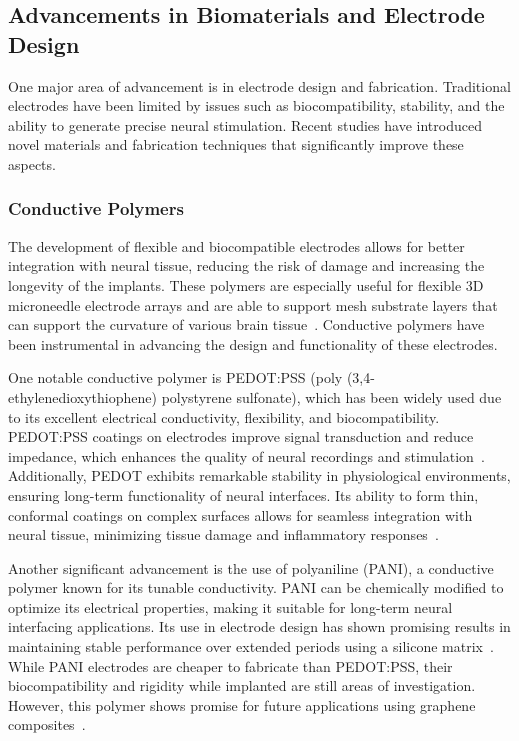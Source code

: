 \documentclass[twocolumn,10pt]{article}
\begin{document}
\subsection*{Advancements in Biomaterials and Electrode Design}
One major area of advancement is in electrode design and fabrication.
Traditional electrodes have been limited by issues such as biocompatibility,
stability, and the ability to generate precise neural stimulation. Recent
studies have introduced novel materials and fabrication techniques that
significantly improve these aspects.

\subsubsection*{Conductive Polymers}
The development of flexible and biocompatible electrodes allows for better
integration with neural tissue, reducing the risk of damage and increasing the
longevity of the implants. These polymers are especially useful for flexible 3D
microneedle electrode arrays and are able to support mesh substrate layers that
can support the curvature of various brain
tissue~\parencite{xiangFlexibleThreedimensionalElectrode2016}. Conductive
polymers have been instrumental in advancing the design and functionality of
these electrodes.

One notable conductive polymer is PEDOT:PSS (poly (3,4-ethylenedioxythiophene)
polystyrene sulfonate), which has been widely used due to its excellent
electrical conductivity, flexibility, and biocompatibility. PEDOT:PSS coatings
on electrodes improve signal transduction and reduce impedance, which enhances
the quality of neural recordings and
stimulation~\parencite{rivnayHighperformanceTransistorsBioelectronics2015}.
Additionally, PEDOT exhibits remarkable stability in physiological environments,
ensuring long-term functionality of neural interfaces. Its ability to form thin,
conformal coatings on complex surfaces allows for seamless integration with
neural tissue, minimizing tissue damage and inflammatory
responses~\parencite{zhangRecentProgressPEDOTbased2022}.

Another significant advancement is the use of polyaniline (PANI), a conductive
polymer known for its tunable conductivity. PANI can be
chemically modified to optimize its electrical properties, making it suitable
for long-term neural interfacing applications. Its use in electrode design has
shown promising results in maintaining stable performance over extended periods
using a silicone matrix~\parencite{almuflehHighlyFlexiblePolyanilineBased2021}.
While PANI electrodes are cheaper to fabricate than PEDOT:PSS, their
biocompatibility and rigidity while implanted are still areas of investigation.
However, this polymer shows promise for future applications using graphene
composites~\parencite{liuBiocompatibleHighPerformanceWetAdhesive2021,fangBiocompatibleElectrodeExoelectrogens2024}.
\end{document}
